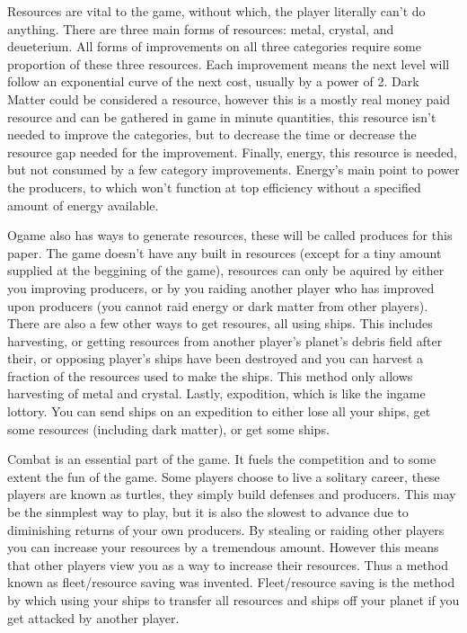 \documentclass[twoside,twocolumn]{article}
\begin{document}
Resources are vital to the game, without which, the player literally can't do anything.
There are three main forms of resources: metal, crystal, and deueterium.  All
forms of improvements on all three categories require some proportion of these
three resources.  Each improvement means the next level will follow an
exponential curve of the next cost, usually by a power of 2.  Dark Matter could be
considered a resource, however this is a mostly real money paid resource and can
be gathered in game in minute quantities, this resource isn't needed to improve the
categories, but to decrease the time or decrease the resource gap needed for the
improvement.  Finally, energy, this resource is needed, but not consumed by a few
category improvements.  Energy's main point to power the producers, to which won't
function at top efficiency without a specified amount of energy available.

Ogame also has ways to generate resources, these will be called produces for this
paper.  The game doesn't have any built in resources (except for a tiny amount
supplied at the beggining of the game), resources can only be aquired by either
you improving producers, or by you raiding another player who has improved upon
producers (you cannot raid energy or dark matter from other players).  There are
also a few other ways to get resoures, all using ships.  This includes harvesting,
or getting resources from another player's planet's debris field after their, or
opposing player's ships have been destroyed and you can harvest a fraction of the
resources used to make the ships.  This method only allows harvesting of metal and
crystal.  Lastly, expodition, which is like the ingame lottory.  You can send ships
on an expedition to either lose all your ships, get some resources (including dark matter),
or get some ships.

Combat is an essential part of the game.  It fuels the competition and to some
extent the fun of the game.  Some players choose to live a solitary career, these
players are known as turtles, they simply build defenses and producers.  This
may be the sinmplest way to play, but it is also the slowest to advance due to
diminishing returns of your own producers.  By stealing or raiding other players
you can increase your resources by a tremendous amount.  However this means that
other players view you as a way to increase their resources.  Thus a method known
as fleet/resource saving was invented.  Fleet/resource saving is the method by
which using your ships to transfer all resources and ships off your planet if
you get attacked by another player.
\end{document}
